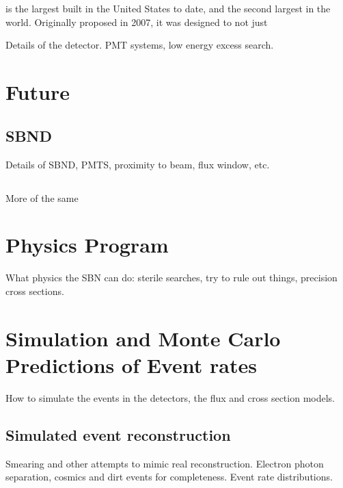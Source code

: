 \section{\uboone}

\uboone is the largest \lartpc built in the United States to date, and the second largest in the world.  Originally proposed in 2007, it was designed to not just 

Details of the \uboone detector.  PMT systems, low energy excess search.

\section{Future \lartpcs}

\subsection{SBND}

Details of SBND, PMTS, proximity to beam, flux window, etc.

\subsection{\icarus}

More of the same

\section{Physics Program}

What physics the SBN can do: sterile searches, try to rule out things, precision cross sections.

\section{Simulation and Monte Carlo Predictions of Event rates}

How to simulate the events in the detectors, the flux and cross section models.

\subsection{Simulated event reconstruction}

Smearing and other attempts to mimic real reconstruction.  Electron photon separation, cosmics and dirt events for completeness.  Event rate distributions.
